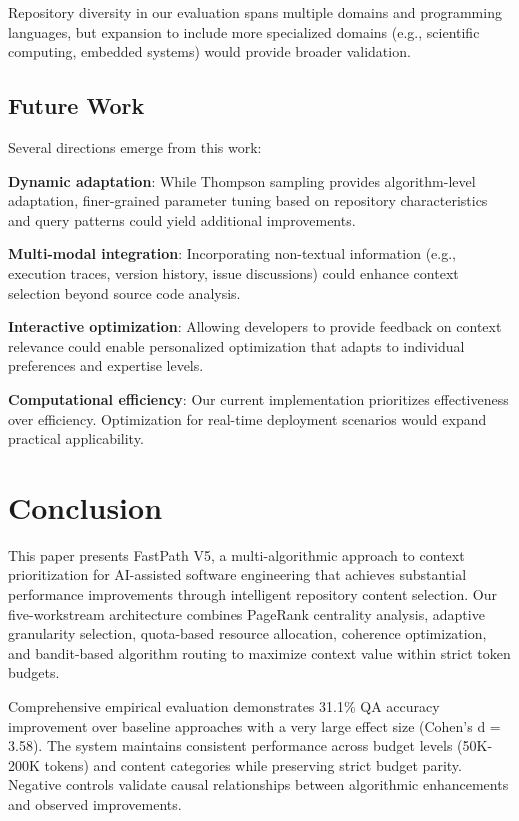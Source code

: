 \documentclass[conference]{IEEEtran}
\begin{document}
Repository diversity in our evaluation spans multiple domains and programming languages, but expansion to include more specialized domains (e.g., scientific computing, embedded systems) would provide broader validation.

\subsection{Future Work}

Several directions emerge from this work:

\textbf{Dynamic adaptation}: While Thompson sampling provides algorithm-level adaptation, finer-grained parameter tuning based on repository characteristics and query patterns could yield additional improvements.

\textbf{Multi-modal integration}: Incorporating non-textual information (e.g., execution traces, version history, issue discussions) could enhance context selection beyond source code analysis.

\textbf{Interactive optimization}: Allowing developers to provide feedback on context relevance could enable personalized optimization that adapts to individual preferences and expertise levels.

\textbf{Computational efficiency}: Our current implementation prioritizes effectiveness over efficiency. Optimization for real-time deployment scenarios would expand practical applicability.

\section{Conclusion}

This paper presents FastPath V5, a multi-algorithmic approach to context prioritization for AI-assisted software engineering that achieves substantial performance improvements through intelligent repository content selection. Our five-workstream architecture combines PageRank centrality analysis, adaptive granularity selection, quota-based resource allocation, coherence optimization, and bandit-based algorithm routing to maximize context value within strict token budgets.

Comprehensive empirical evaluation demonstrates 31.1\% QA accuracy improvement over baseline approaches with a very large effect size (Cohen's d = 3.58). The system maintains consistent performance across budget levels (50K-200K tokens) and content categories while preserving strict budget parity. Negative controls validate causal relationships between algorithmic enhancements and observed improvements.
\end{document}
